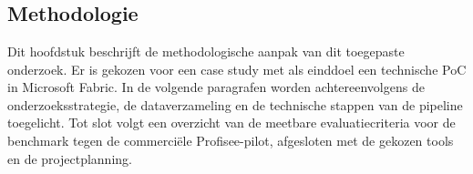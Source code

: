 
\chapter{}%
\label{ch:methodologie}


\section{Methodologie}%
\label{sec:methodologie}

Dit hoofdstuk beschrijft de methodologische aanpak van dit toegepaste onderzoek. Er is gekozen voor een case study met als einddoel een technische PoC in Microsoft Fabric. In de volgende paragrafen worden achtereenvolgens de onderzoeksstrategie, de dataverzameling en de technische stappen van de pipeline toegelicht. Tot slot volgt een overzicht van de meetbare evaluatiecriteria voor de benchmark tegen de commerciële Profisee-pilot, afgesloten met de gekozen tools en de projectplanning.


